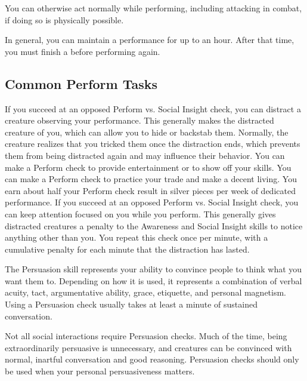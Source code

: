     You can otherwise act normally while performing, including attacking in combat, if doing so is physically possible.

    In general, you can maintain a performance for up to an hour.
    After that time, you must finish a  before performing again.

  \subsection{Common Perform Tasks}
     If you succeed at an opposed Perform vs. Social Insight check, you can distract a creature observing your performance.
    This generally makes the distracted creature  \partiallyunaware of you, which can allow you to hide or backstab them.
    Normally, the creature realizes that you tricked them once the distraction ends, which prevents them from being distracted again and may influence their behavior.
     You can make a Perform check to provide entertainment or to show off your skills.
     You can make a Perform check to practice your trade and make a decent living.
    You earn about half your Perform check result in silver pieces per week of dedicated performance.
     If you succeed at an opposed Perform vs. Social Insight check, you can keep attention focused on you while you perform.
    This generally gives distracted creatures a  penalty to the Awareness and Social Insight skills to notice anything other than you.
    You repeat this check once per minute, with a cumulative  penalty for each minute that the distraction has lasted.

\newpage
{}
  The Persuasion skill represents your ability to convince people to think what you want them to.
  Depending on how it is used, it represents a combination of verbal acuity, tact, argumentative ability, grace, etiquette, and personal magnetism.
  Using a Persuasion check usually takes at least a minute of sustained conversation.

  Not all social interactions require Persuasion checks. Much of the time, being extraordinarily persuasive is unnecessary, and creatures can be convinced with normal, inartful conversation and good reasoning. Persuasion checks should only be used when your personal persuasiveness matters.


